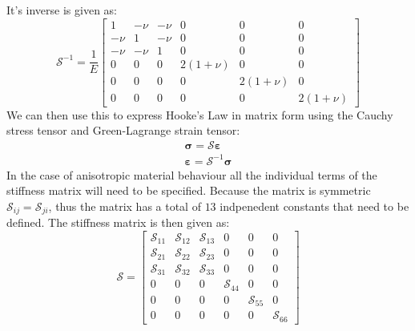 \documentclass[11pt, a4paper]{article}
\renewcommand*{\epsilon}{\varepsilon}
\numberwithin{equation}{section}
\numberwithin{figure}{section}
\begin{document}
It's inverse is given as:
\begin{equation}
  \mathcal{S}^{-1} = \frac{1}{E}
  \begin{bmatrix}
    1     & -\nu  & -\nu  & 0        & 0         & 0\\
    -\nu  & 1     & -\nu  & 0        & 0         & 0\\
    -\nu  & -\nu  & 1     & 0        & 0         & 0\\
    0     & 0     & 0     & 2(1+\nu) & 0         & 0\\
    0     & 0     & 0     & 0        &  2(1+\nu) & 0\\
    0     & 0     & 0     & 0        &  0        & 2(1+\nu)
  \end{bmatrix}
\end{equation}
We can then use this to express Hooke's Law in matrix form using the Cauchy stress tensor and Green-Lagrange strain tensor:
\begin{gather}
  \mathbf{\sigma} = \mathcal{S}\mathbf{\epsilon}\\
  \mathbf{\epsilon} = \mathcal{S}^{-1} \mathbf{\sigma}
\end{gather}
In the case of anisotropic material behaviour all the individual terms of the stiffness matrix will need to be specified. Because the matrix is symmetric $\mathcal{S}_{ij} = \mathcal{S}_{ji}$, thus the matrix has a total of $13$ indpenedent constants that need to be defined. The stiffness matrix is then given as:
\begin{equation}
  \mathcal{S} =
  \begin{bmatrix}
    \mathcal{S}_{11} & \mathcal{S}_{12} & \mathcal{S}_{13} & 0                & 0                 & 0\\
    \mathcal{S}_{21} & \mathcal{S}_{22} & \mathcal{S}_{23} & 0                & 0                 & 0\\
    \mathcal{S}_{31} & \mathcal{S}_{32} & \mathcal{S}_{33} & 0                & 0                 & 0\\
    0                & 0                & 0                & \mathcal{S}_{44} & 0                 & 0\\
    0                & 0                & 0                & 0                 & \mathcal{S}_{55} & 0\\
    0                & 0                & 0                & 0                 & 0                & \mathcal{S}_{66}
  \end{bmatrix}
\end{equation}
\end{document}
